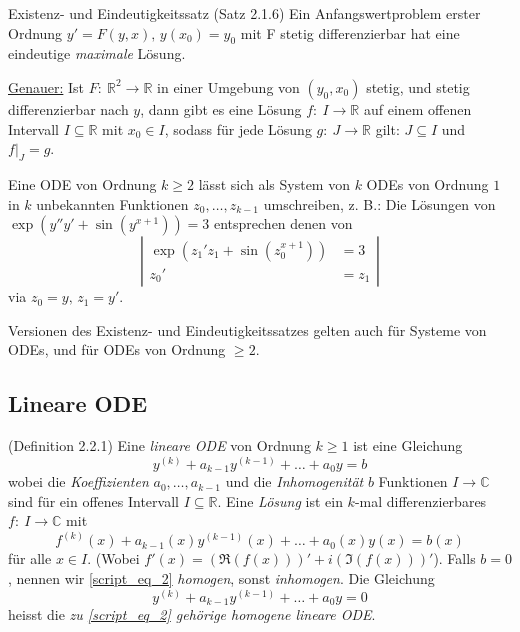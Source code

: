 \documentclass[a4paper,10pt]{article}
\def\R{\mathbb{R}}
\def\C{\mathbb{C}}
\begin{document}
\begin{mainbox}{Existenz- und Eindeutigkeitssatz (Satz 2.1.6)}
    Ein Anfangswertproblem erster Ordnung \( y' = F(y, x), \, y(x_0) = y_0 \) mit F stetig differenzierbar hat eine eindeutige \emph{maximale} Lösung.
\end{mainbox}

\underline{Genauer:} Ist \( F: \: \R^2 \to \R \) in einer Umgebung von \( (y_0, x_0) \) stetig, und stetig differenzierbar nach \( y \), dann gibt es eine Lösung \( f: \: I \to \R \) auf einem offenen Intervall \( I \subseteq \R \) mit \( x_0 \in I \), sodass für jede Lösung \( g: \: J \to \R \) gilt: \( J \subseteq I \) und \( f|_J = g \).

Eine ODE von Ordnung \( k \geq 2 \) lässt sich als System von \( k \) ODEs von Ordnung \( 1 \) in \( k \) unbekannten Funktionen \( z_0, \dots, z_{k - 1} \) umschreiben, z. B.: Die Lösungen von \( \exp(y'' y' + \sin(y^{x + 1})) = 3 \) entsprechen denen von
\[ \left| \begin{aligned}
    \exp(z_1' z_1 + \sin(z_0^{x + 1})) &= 3 \\
    z_0' &= z_1
\end{aligned} \right| \]
via \( z_0 = y, \, z_1 = y' \).

Versionen des Existenz- und Eindeutigkeitssatzes gelten auch für Systeme von ODEs, und für ODEs von Ordnung \( \geq 2 \).


\subsection{Lineare ODE}

\begin{mainbox}{(Definition 2.2.1)}
    Eine \emph{lineare ODE} von Ordnung \( k \geq 1 \) ist eine Gleichung
    \begin{equation} \label{script_eq_2}
        y^{(k)} + a_{k - 1} y^{(k - 1)} + \dots + a_0 y = b
    \end{equation}
    wobei die \emph{Koeffizienten} \( a_0, \dots, a_{k - 1} \) und die \emph{Inhomogenität} \( b \) Funktionen \( I \to \C \) sind für ein offenes Intervall \( I \subseteq \R\).
    Eine \emph{Lösung} ist ein \( k \)-mal differenzierbares \( f: \: I \to \C \) mit
    \[ f^{(k)}(x) + a_{k - 1}(x) y^{(k - 1)}(x) + \dots + a_0(x) y(x) = b(x) \]
    für alle \( x \in I \). (Wobei \( f'(x) = (\Re(f(x)))' + i (\Im(f(x)))' \)).
    Falls \( b = 0 \), nennen wir \eqref{script_eq_2} \emph{homogen}, sonst \emph{inhomogen}.
    Die Gleichung
    \begin{equation} \label{script_eq_3}
        y^{(k)} + a_{k - 1} y^{(k - 1)} + \dots + a_0 y = 0
    \end{equation}
    heisst die \emph{zu \eqref{script_eq_2} gehörige homogene lineare ODE}.
\end{mainbox}
\end{document}

